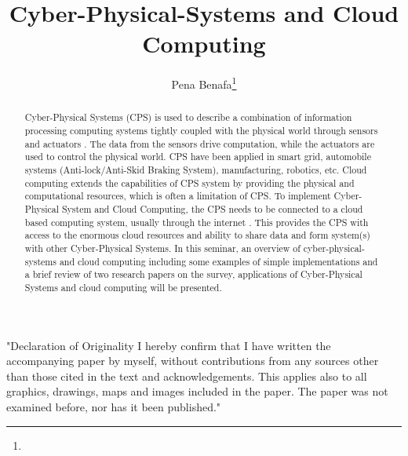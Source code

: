 \documentclass[english]{lni}
\begin{document}
\title[Titlel]{Cyber-Physical-Systems and Cloud Computing}
\author[Pena Benafa]{Pena Benafa\footnote{ } }

\maketitle
\tableofcontents

\newpage

"Declaration of Originality
I hereby confirm that I have written the accompanying paper by myself, without contributions from any sources other than those cited in the text and acknowledgements.
This applies also to all graphics, drawings, maps and images included in the paper.
The paper was not examined before, nor has it been published."

\newpage

\begin{abstract}
Cyber-Physical Systems (CPS) is used to describe a combination of information processing computing systems tightly coupled with the physical world through sensors and actuators \cite{b4}.
The data from the sensors drive computation, while the actuators are used to control the physical world. CPS have been applied in smart grid, automobile systems  (Anti-lock/Anti-Skid Braking System), manufacturing, robotics, etc. Cloud computing extends the capabilities of CPS system by providing the physical and computational resources, which is often a limitation of CPS. To implement Cyber-Physical System and Cloud Computing, the CPS needs to be connected to a cloud based computing system, usually through the internet \cite{c5}. This provides the CPS with access to the enormous cloud resources and ability to share data and form system(s) with other Cyber-Physical Systems. In this seminar, an overview of cyber-physical-systems and cloud computing including some examples of simple implementations and a brief review of two research papers on the survey, applications of Cyber-Physical Systems and cloud computing will be presented. 
\end{abstract}

\newpage
\end{document}
